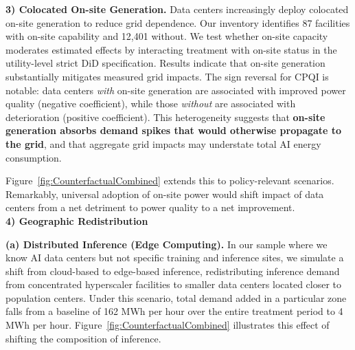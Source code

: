 \documentclass[sigconf,authordraft]{acmart}
\newcommand{\nb}[1]{\textcolor{blue}{NB[#1]}}
\begin{document}
\noindent\textbf{3) Colocated On-site Generation.} Data centers increasingly deploy colocated on-site generation to reduce grid dependence. Our inventory identifies 87 facilities with on-site capability and 12,401 without. We test whether on-site capacity moderates estimated effects by interacting treatment with on-site status in the utility-level strict DiD specification. Results indicate that on-site generation substantially mitigates measured grid impacts. The sign reversal for CPQI is notable: data centers \textit{with} on-site generation are associated with improved power quality (negative coefficient), while those \textit{without} are associated with deterioration (positive coefficient). This heterogeneity suggests that \textbf{on-site generation absorbs demand spikes that would otherwise propagate to the grid}, and that aggregate grid impacts may understate total AI energy consumption.

Figure~\ref{fig:CounterfactualCombined} extends this to policy-relevant scenarios. Remarkably, universal adoption of on-site power would shift impact of data centers from a net detriment to power quality to a net improvement.\\


\noindent\textbf{4) Geographic Redistribution}


\noindent\textbf{(a) Distributed Inference (Edge Computing).} In our sample where we know AI data centers but not specific training and inference sites, we simulate a shift from cloud-based to edge-based inference, redistributing inference demand from concentrated hyperscaler facilities to smaller data centers located closer to population centers. Under this scenario, total demand added in a particular zone falls from a baseline of 162 MWh per hour over the entire treatment period to 4 MWh per hour. Figure~\ref{fig:CounterfactualCombined} illustrates this effect of shifting the composition of inference.
\end{document}
